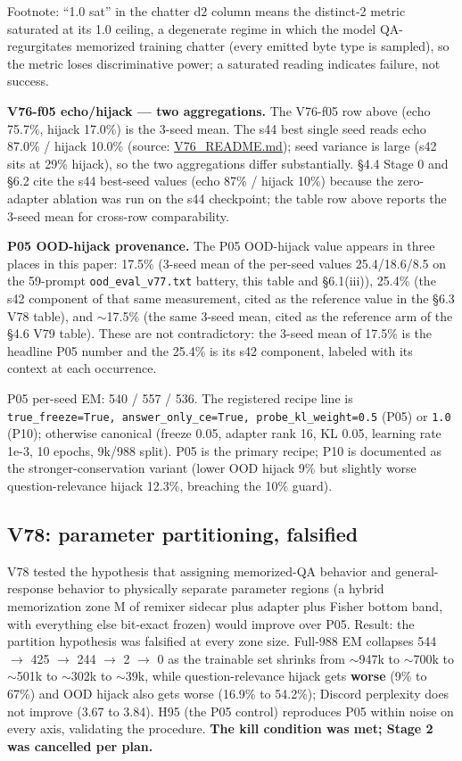 \documentclass[11pt]{article}
\begin{document}
Footnote: ``1.0 sat'' in the chatter d2 column means the distinct-2 metric saturated at its 1.0 ceiling, a degenerate regime in which the model QA-regurgitates memorized training chatter (every emitted byte type is sampled), so the metric loses discriminative power; a saturated reading indicates failure, not success.

\textbf{V76-f05 echo/hijack --- two aggregations.} The V76-f05 row above (echo 75.7\%, hijack 17.0\%) is the 3-seed mean. The s44 best single seed reads echo 87.0\% / hijack 10.0\% (source: \href{https://github.com/llaa33219/MicroMixer-4/blob/4bb630413dfa58ef3141291e121ab8c006d03235/V76_README.md}{V76\_README.md}); seed variance is large (s42 sits at 29\% hijack), so the two aggregations differ substantially. \S4.4 Stage 0 and \S6.2 cite the s44 best-seed values (echo 87\% / hijack 10\%) because the zero-adapter ablation was run on the s44 checkpoint; the table row above reports the 3-seed mean for cross-row comparability.

\textbf{P05 OOD-hijack provenance.} The P05 OOD-hijack value appears in three places in this paper: 17.5\% (3-seed mean of the per-seed values 25.4/18.6/8.5 on the 59-prompt \texttt{ood\_eval\_v77.txt} battery, this table and \S6.1(iii)), 25.4\% (the s42 component of that same measurement, cited as the reference value in the \S6.3 V78 table), and $\sim$17.5\% (the same 3-seed mean, cited as the reference arm of the \S4.6 V79 table). These are not contradictory: the 3-seed mean of 17.5\% is the headline P05 number and the 25.4\% is its s42 component, labeled with its context at each occurrence.

P05 per-seed EM: 540 / 557 / 536. The registered recipe line is \texttt{true\_freeze=True, answer\_only\_ce=True, probe\_kl\_weight=0.5} (P05) or \texttt{1.0} (P10); otherwise canonical (freeze 0.05, adapter rank 16, KL 0.05, learning rate 1e-3, 10 epochs, 9k/988 split). P05 is the primary recipe; P10 is documented as the stronger-conservation variant (lower OOD hijack 9\% but slightly worse question-relevance hijack 12.3\%, breaching the 10\% guard).

\subsection{V78: parameter partitioning, falsified}

V78 tested the hypothesis that assigning memorized-QA behavior and general-response behavior to physically separate parameter regions (a hybrid memorization zone M of remixer sidecar plus adapter plus Fisher bottom band, with everything else bit-exact frozen) would improve over P05. Result: the partition hypothesis was falsified at every zone size. Full-988 EM collapses 544 $\to$ 425 $\to$ 244 $\to$ 2 $\to$ 0 as the trainable set shrinks from $\sim$947k to $\sim$700k to $\sim$501k to $\sim$302k to $\sim$39k, while question-relevance hijack gets \textbf{worse} (9\% to 67\%) and OOD hijack also gets worse (16.9\% to 54.2\%); Discord perplexity does not improve (3.67 to 3.84). H95 (the P05 control) reproduces P05 within noise on every axis, validating the procedure. \textbf{The kill condition was met; Stage 2 was cancelled per plan.}
\end{document}
